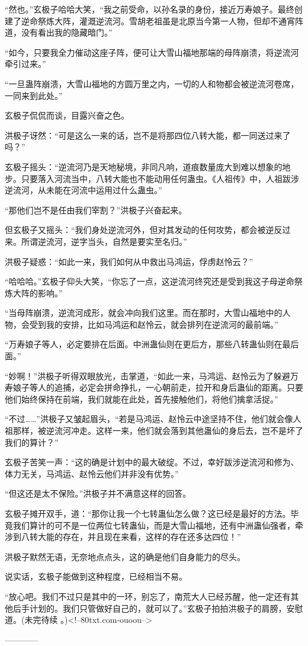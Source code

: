 \begin{this_body}
“然也。”玄极子哈哈大笑，“我之前受命，以孙名录的身份，接近万寿娘子。最终创建了逆命祭炼大阵，灌溉逆流河。雪胡老祖虽是北原当今第一人物，但却不通宵阵道，没有看出我的隐藏暗门。”

“如今，只要我全力催动这座子阵，便可让大雪山福地那端的母阵崩溃，将逆流河牵引过来。”

“一旦蛊阵崩溃，大雪山福地的方圆万里之内，一切的人和物都会被逆流河卷席，一同来到此处。”

玄极子侃侃而谈，目露兴奋之色。

洪极子讶然：“可是这么一来的话，岂不是将那四位八转大能，都一同送过来了吗？”

玄极子摇头：“逆流河乃是天地秘境，非同凡响，道痕数量庞大到难以想象的地步。只要落入河流当中，八转大能也不能动用任何蛊虫。《人祖传》中，人祖跋涉逆流河，从未能在河流中运用过什么蛊虫。”

“那他们岂不是任由我们宰割？”洪极子兴奋起来。

但玄极子又摇头：“我们身处逆流河外，但对其发动的任何攻势，都会被逆反过来。所谓逆流河，逆字当头，自然是要实至名归。”

洪极子疑惑：“如此一来，我们如何从中救出马鸿运，俘虏赵怜云？”

“哈哈哈。”玄极子仰头大笑，“你忘了一点，这逆流河终究还是受到我这子母逆命祭炼大阵的影响。”

“当母阵崩溃，逆流河成形，就会冲向我们这里。而在那时，大雪山福地中的人物，会受到我的安排，比如马鸿运和赵怜云，就会排列在逆流河的最前端。”

“万寿娘子等人，必定要排在后面。中洲蛊仙则在更后方，那些八转蛊仙则在最后面。”

“妙啊！”洪极子听得双眼放光，击掌道，“如此一来，马鸿运、赵怜云为了躲避万寿娘子等人的追捕，必定会拼命挣扎，一心朝前走，拉开和身后蛊仙的距离。只要他们始终保持在前端，我们就能在此处，首先接触他们，将他们擒拿活捉。”

“不过……”洪极子又皱起眉头，“若是马鸿运、赵怜云中途坚持不住，他们就会像人祖那样，被逆流河冲走。这样一来，他们就会落到其他蛊仙的身后去，岂不是坏了我们的算计？”

玄极子苦笑一声：“这的确是计划中的最大破绽。不过，幸好跋涉逆流河和修为、体力无关，马鸿运、赵怜云他们并非没有优势。”

“但这还是太不保险。”洪极子并不满意这样的回答。

玄极子摊开双手，道：“那你让我一个七转蛊仙怎么做？这已经是最好的方法。毕竟我们算计的可不是一位两位七转蛊仙，而是大雪山福地，还有中洲蛊仙强者，牵涉到八转大能的存在，并且现在来看，这样的存在还多达四位！”

洪极子默然无语，无奈地点点头，这的确是他们自身能力的尽头。

说实话，玄极子能做到这种程度，已经相当不易。

“放心吧。我们不过只是其中的一环，别忘了，南荒大人已经苏醒，他一定还有其他后手计划的。我们只管做好自己的，就可以了。”玄极子拍拍洪极子的肩膀，安慰道。(未完待续 。)<!--80txt.com-ouoou-->

------------

\end{this_body}

